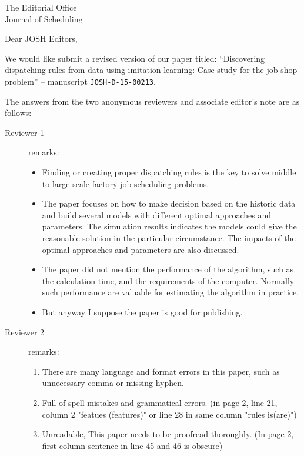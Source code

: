 \documentclass[]{letter}
\begin{document}

\begin{letter}{The Editorial Office \\ Journal of Scheduling}
\address{	
    Helga Ingimundardottir\\
    University of Iceland\\
    Dunhaga 5, IS-107 Reykjavik, Iceland\\
}

\opening{Dear JOSH Editors,}

We would like submit a revised version of our paper titled: ``Discovering 
dispatching rules from data using imitation learning: Case study for the 
job-shop problem'' -- manuscript \texttt{JOSH-D-15-00213}.

The answers from the two anonymous reviewers and associate editor's note are as 
follows:
\begin{description}
    \item[Reviewer 1] remarks: 
    
    \begin{itemize}
    \item Finding or creating proper dispatching rules is the key to solve 
    middle to large scale factory job scheduling problems.
    \item The paper focuses on how to make decision based on the historic data 
    and build several models with different optimal approaches and parameters. 
    The simulation results indicates the models could give the reasonable 
    solution in the particular circumstance. The impacts of the optimal 
    approaches and parameters are also discussed.
    \item The paper did not mention the performance of the algorithm, such as 
    the calculation time, and the requirements of the computer. Normally such 
    performance are valuable for estimating the algorithm in practice.
    \item But anyway I suppose the paper is good for publishing.
    \end{itemize}    
    \item[Reviewer 2] remarks: 
    \begin{enumerate}
    \item There are many language and format errors in this paper, such as 
    unnecessary comma or missing hyphen.    
    \item Full of spell mistakes and grammatical errors. (in page 2, line 21, 
    column 2 "featues (features)" or line 28 in same column "rules is(are)")    
    \item Unreadable, This paper needs to be proofread thoroughly. (In page 2, 
    first column sentence in line 45 and 46 is obscure)
    \end{enumerate}


\end{description}
\end{letter}
\end{document}
